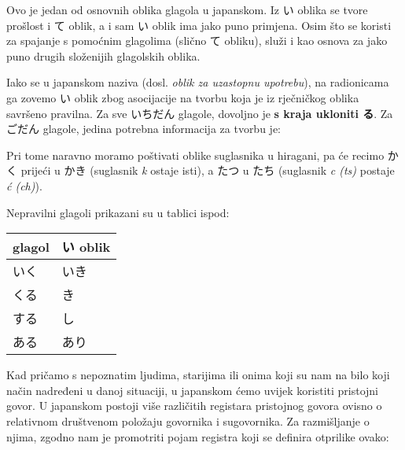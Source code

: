 
\author{Tomislav Mamić}


	
	
	Ovo je jedan od osnovnih oblika glagola u japanskom. Iz い oblika se tvore prošlost i て oblik, a i sam い oblik ima jako puno primjena. Osim što se koristi za spajanje s pomoćnim glagolima (slično て obliku), služi i kao osnova za jako puno drugih složenijih glagolskih oblika.
	
	
	Iako se u japanskom naziva  (dosl. \textit{oblik za uzastopnu upotrebu}), na radionicama ga zovemo い oblik zbog asocijacije na tvorbu koja je iz rječničkog oblika savršeno pravilna. Za sve いちだん glagole, dovoljno je \textbf{s kraja ukloniti る}. Za ごだん glagole, jedina potrebna informacija za tvorbu je:
	
	
	Pri tome naravno moramo poštivati oblike suglasnika u hiragani, pa će recimo かく prijeći u かき (suglasnik \textit{k} ostaje isti), a たつ u たち (suglasnik \textit{c (ts)} postaje \textit{ć (ch)}).
	
	Nepravilni glagoli prikazani su u tablici ispod:
	
	\vspace{10pt}
	\begin{tabular}{|l|l|}
		\hline
		\textbf{glagol}&\textbf{い oblik}\\
		\hline
		いく&いき\\
		\hline
		くる&き\\
		\hline
		する&し\\
		\hline
		ある&あり\\
		\hline
	\end{tabular}
	
	
	Kad pričamo s nepoznatim ljudima, starijima ili onima koji su nam na bilo koji način nadređeni u danoj situaciji, u japanskom ćemo uvijek koristiti pristojni govor. U japanskom postoji više različitih registara pristojnog govora ovisno o relativnom društvenom položaju govornika i sugovornika. Za razmišljanje o njima, zgodno nam je promotriti pojam registra koji se definira otprilike ovako:
	
